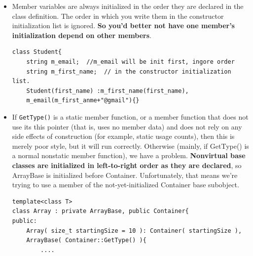 \documentclass[a4paper,11pt,twoside]{book}
\begin{document}
\begin{itemize}
	\item Member variables are always initialized in the order they are declared in the class definition. The order in which you write them in the constructor initialization list is ignored.  \textbf{So you'd better not have one member's initialization depend on other members}.
	
\begin{lstlisting}[numbers=none]
class Student{
	string m_email;  //m_email will be init first, ingore order
	string m_first_name;  // in the constructor initialization list.
	Student(first_name) :m_first_name(first_name),
	m_email(m_first_anme+"@gmail"){}
\end{lstlisting}
		
		
		\item If \texttt{GetType()} is a static member function, or a member function that does not use its this pointer (that is, uses no member data) and does not rely on any side effects of construction (for example, static usage counts), then this is merely poor style, but it will run correctly. Otherwise (mainly, if GetType() is a normal nonstatic member function), we have a problem.
		\textbf{Nonvirtual base classes are initialized in left-to-right order as they are declared}, so ArrayBase is initialized before Container. Unfortunately, that means we're trying to use a member of the not-yet-initialized Container base subobject.
		
\begin{lstlisting}[numbers=none]
template<class T>
class Array : private ArrayBase, public Container{
public:
	Array( size_t startingSize = 10 ): Container( startingSize ), 
	ArrayBase( Container::GetType() ){
		....
\end{lstlisting}
		
	\end{itemize}
\end{document}

